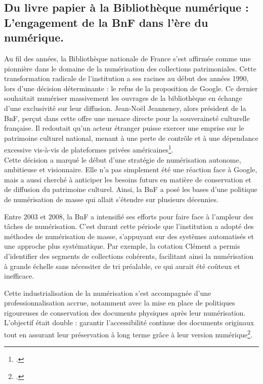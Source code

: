 \documentclass[a4paper,12pt,twoside]{book}
\begin{document}
\subsection{Du livre papier à la Bibliothèque numérique : L’engagement de la BnF dans
	l’ère du numérique.}
	
	Au fil des années, la Bibliothèque nationale de France s’est affirmée
	comme une pionnière dans le domaine de la numérisation des collections
	patrimoniales. Cette transformation radicale de l’institution a ses racines au
	début des années 1990, lors d’une décision déterminante : le refus de la
	proposition de Google. Ce dernier souhaitait numériser massivement les
	ouvrages de la bibliothèque en échange d’une exclusivité sur leur diffusion.
	Jean-Noël Jeanneney, alors président de la BnF, perçut dans cette offre une
	menace directe pour la souveraineté culturelle française. Il redoutait qu’un
	acteur étranger puisse exercer une emprise sur le patrimoine culturel national,
	menant à une perte de contrôle et à une dépendance excessive vis-à-vis de
	plateformes privées américaines\footcite{bruckmann_numerisation_2012}.
	\\
	
	Cette décision a marqué le début d’une stratégie de numérisation
	autonome, ambitieuse et visionnaire. Elle n’a pas simplement été une réaction
	face à Google, mais a aussi cherché à anticiper les besoins futurs en matière de
	conservation et de diffusion du patrimoine culturel. Ainsi, la BnF a posé les
	bases d’une politique de numérisation de masse qui allait s’étendre sur
	plusieurs décennies.
	
	
	Entre 2003 et 2008, la BnF a intensifié ses efforts pour faire face à
	l’ampleur des tâches de numérisation. C’est durant cette période que
	l’institution a adopté des méthodes de numérisation de masse, s’appuyant sur
	des systèmes automatisés et une approche plus systématique. Par exemple, la
	cotation Clément a permis d’identifier des segments de collections cohérents,
	facilitant ainsi la numérisation à grande échelle sans nécessiter de tri préalable,
	ce qui aurait été coûteux et inefficace.
	
	Cette industrialisation de la numérisation s’est accompagnée d’une
	professionnalisation accrue, notamment avec la mise en place de politiques
	rigoureuses de conservation des documents physiques après leur
	numérisation. L’objectif était double : garantir l’accessibilité continue des
	documents originaux tout en assurant leur préservation à long terme grâce à
	leur version numérique\footcite{bermes_numerique_2020}.
	\\
	
\end{document}
